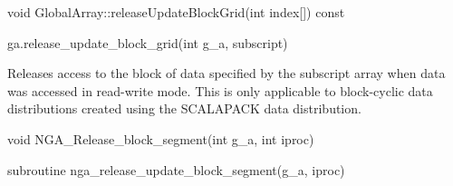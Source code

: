 \documentclass[12pt]{article}
\begin{document}
\begin{cxxapi}
\begin{cxxcode}
void GlobalArray::releaseUpdateBlockGrid(int index[]) const
\end{cxxcode}
\begin{funcargs}
\end{funcargs}
\end{cxxapi}

\begin{pyapi}
\begin{pycode}
ga.release_update_block_grid(int g_a, subscript)
\end{pycode}
\begin{funcargs}
\end{funcargs}
\end{pyapi}

\local

\begin{desc}

Releases access to the block of data specified by the subscript array when data
was accessed in read-write mode. This is only applicable to block-cyclic data
distributions created using the SCALAPACK data distribution.

\end{desc}



\begin{capi}
\begin{ccode}
void NGA_Release_block_segment(int g_a, int iproc)
\end{ccode}
\begin{funcargs}
\end{funcargs}
\end{capi}

\begin{fapi}
\begin{fcode}
subroutine nga_release_update_block_segment(g_a, iproc)
\end{fcode}
\begin{funcargs}
\end{funcargs}
\end{fapi}
\end{document}
